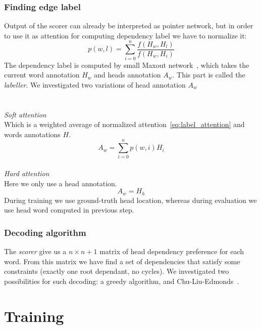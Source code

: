 \subsubsection{Finding edge label}
Output of the scorer can already be interpreted as
pointer network, but in order to use it as attention for computing dependency label
we have to normalize it:
\begin{equation} \label{eq:label_attention}
    p(w,l) = \sum_{i=0}^{n} \frac{f(H_w, H_l)}{f(H_w, H_i)}
\end{equation}
The dependency label is computed by small Maxout network~\cite{goodfellow_maxout_2013},
which takes the current word annotation $H_w$ and heads annotation $A_w$. This
part is called the \emph{labeller}.
We investigated two variations of head annotation $A_w$
\\
\\
\\
\emph{Soft attention}\\
Which is a weighted average of normalized attention~\ref{eq:label_attention}
and words annotations $H$. 
$$ A_w = \sum_{i=0}^{n} p(w,i)H_i $$
\\
\emph{Hard attention}\\
Here we only use a head annotation.
$$ A_w = H_h $$
During training we use ground-truth head location, whereas during evaluation
we use head word computed in previous step.

\subsubsection{Decoding algorithm}
The \emph{scorer} give us a $n \times n+1$ matrix of head dependency preference
for each word. From this matrix we have find a set of dependencies that satisfy
some constraints (exactly one root dependant, no cycles).
We investigated two possibilities for such decoding: a greedy algorithm, and
Chu-Liu-Edmonds~\cite{edmonds_optimim_1966}.

\section{Training}
